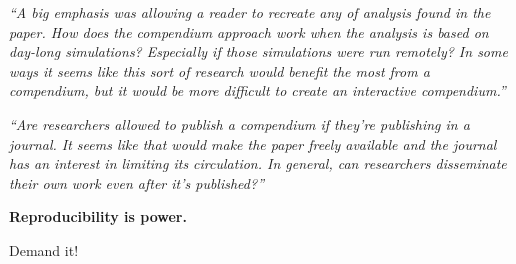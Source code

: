 \documentclass[portrait,11pt]{seminar}
\begin{document}
\es

\bs
\it ``A big emphasis was allowing a reader to recreate any of analysis found in the paper. How does the compendium approach work when the analysis is based on day-long simulations? Especially if those simulations were run remotely? In some ways it seems like this sort of research would benefit the most from a compendium, but it would be more difficult to create an interactive compendium.''

\es
\bs

\it ``Are researchers allowed to publish a compendium if they’re publishing in a journal. It seems like that would make the paper freely available and the journal has an interest in limiting its circulation. In general, can researchers disseminate their own work even after it's published?''


\es

\bs
\begin{center}
{\bf \Large Reproducibility is power.

\vspace{5mm}

Demand it!
}
\end{center}

\es
\end{document}
